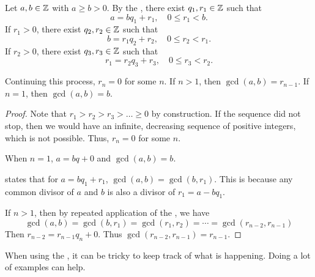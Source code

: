 \documentclass{../ximera}
\begin{document}
\begin{thm*}\label{euclid-alg}
	Let $a,b\in\mathbb Z$ with $a\geq b>0$. By the , there exist $q_1,r_1\in\mathbb Z$ such that 
	\[a=b q_1+r_1,\quad 0\leq r_1<b.\]
	If $r_1>0$, there exist $q_2,r_2\in\mathbb Z$ such that 
	\[b=r_1 q_2+r_2,\quad 0\leq r_2<r_1.\]
	If $r_2>0$, there exist $q_3,r_3\in\mathbb Z$ such that 
	\[r_1=r_2 q_3+r_3,\quad 0\leq r_3<r_2.\]
	
	Continuing this process, $r_n=0$ for some $n$. If $n>1$, then $\gcd(a,b)=r_{n-1}$. If $n=1$, then $\gcd(a,b)=b$.
\end{thm*}
\begin{proof}
	 Note that $r_1>r_2>r_3>\dots\geq0$ by construction. If the sequence did not stop, then we would have an infinite, decreasing sequence of positive integers, which is not possible. Thus, $r_n=0$ for some $n$. 
	 
	 When $n=1$, $a=bq+0$ and $\gcd(a,b)=b$.
	 
	  states that for $a=bq_1+r_1$, $\gcd(a,b)=\gcd(b,r_1)$. This is because any common divisor of $a$ and $b$  is also a divisor of $r_1=a-bq_1$. 
	 
	 If $n>1$, then by repeated application of the , we have 
	 \[\gcd(a,b)=\gcd(b,r_1)=\gcd(r_1,r_2)=\cdots=\gcd(r_{n-2},r_{n-1})\]
	 Then $r_{n-2}=r_{n-1} q_n+0$. Thus $\gcd(r_{n-2},r_{n-1})=r_{n-1}$.
\end{proof}
	
When using the , it can be tricky to keep track of what is happening. Doing a lot of examples can help.
	
\end{document}
